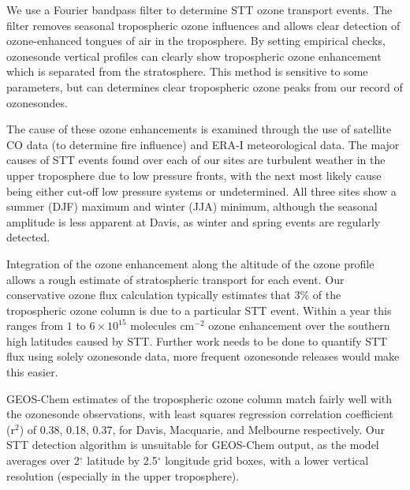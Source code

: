 \documentclass{article}
\begin{document}
  We use a Fourier bandpass filter to determine STT ozone transport events.
  The filter removes seasonal tropospheric ozone influences and allows clear detection of ozone-enhanced tongues of air in the troposphere.
  By setting empirical checks, ozonesonde vertical profiles can clearly show tropospheric ozone enhancement which is separated from the stratosphere.
  This method is sensitive to some parameters, but can determines clear tropospheric ozone peaks from our record of ozonesondes.
  
  The cause of these ozone enhancements is examined through the use of satellite CO data (to determine fire influence) and ERA-I meteorological data.
  The major causes of STT events found over each of our sites are turbulent weather in the upper troposphere due to low pressure fronts, with the next most likely cause being either cut-off low pressure systems or undetermined.
  All three sites show a summer (DJF) maximum and winter (JJA) minimum, although the seasonal amplitude is less apparent at Davis, as winter and spring events are regularly detected.
  
  Integration of the ozone enhancement along the altitude of the ozone profile allows a rough estimate of stratospheric transport for each event.
  Our conservative ozone flux calculation typically estimates that 3\% of the tropospheric ozone column is due to a particular STT event.
  Within a year this ranges from $1$ to $6 \times 10^{15}$ molecules cm$^{-2}$ ozone enhancement over the southern high latitudes caused by STT.
  Further work needs to be done to quantify STT flux using solely ozonesonde data, more frequent ozonesonde releases would make this easier.
  
  GEOS-Chem estimates of the tropospheric ozone column match fairly well with the ozonesonde observations, with least squares regression correlation coefficient (r$^2$) of 0.38, 0.18, 0.37, for Davis, Macquarie, and Melbourne respectively.
  Our STT detection algorithm is unsuitable for GEOS-Chem output, as the model averages over 2$^{\circ}$ latitude by 2.5$^{\circ}$ longitude grid boxes, with a lower vertical resolution (especially in the upper troposphere).
  

\end{document}
